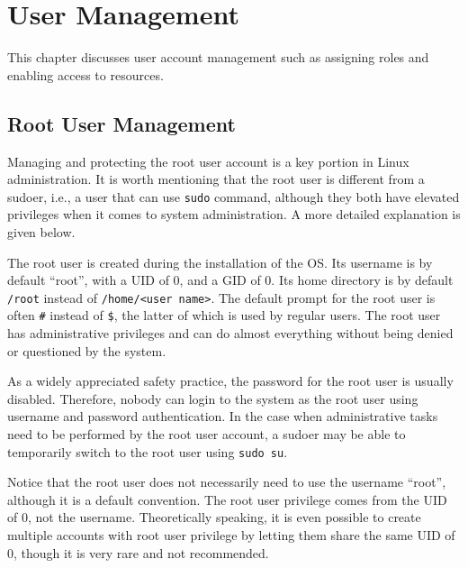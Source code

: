 \chapter{User Management} \label{ch:usermanagement}

This chapter discusses user account management such as assigning roles and enabling access to resources.

\section{Root User Management}

Managing and protecting the root user account is a key portion in Linux administration. It is worth mentioning that the root user is different from a sudoer, i.e., a user that can use \verb|sudo| command, although they both have elevated privileges when it comes to system administration. A more detailed explanation is given below.

The root user is created during the installation of the OS. Its username is by default ``root'', with a UID of 0, and a GID of 0. Its home directory is by default \verb|/root| instead of \verb|/home/<user name>|. The default prompt for the root user is often \verb|#| instead of \verb|$|, the latter of which is used by regular users. The root user has administrative privileges and can do almost everything without being denied or questioned by the system. 

As a widely appreciated safety practice, the password for the root user is usually disabled. Therefore, nobody can login to the system as the root user using username and password authentication. In the case when administrative tasks need to be performed by the root user account, a sudoer may be able to temporarily switch to the root user using \verb|sudo su|.

Notice that the root user does not necessarily need to use the username ``root'', although it is a default convention. The root user privilege comes from the UID of 0, not the username. Theoretically speaking, it is even possible to create multiple accounts with root user privilege by letting them share the same UID of 0, though it is very rare and not recommended.

